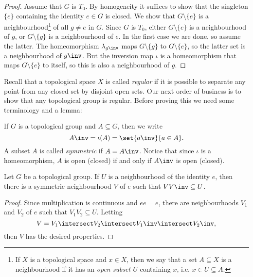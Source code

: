 \documentclass[article, a4paper, 11pt, oneside]{memoir}
\numberwithin{equation}{chapter}
\begin{document}
\begin{proof}
    Assume that $G$ is $T_0$. By homogeneity it suffices to show that the singleton $\{e\}$ containing the identity $e \in G$ is closed. We show that $G \setminus \{e\}$ is a neighbourhood\footnote{If $X$ is a topological space and $x \in X$, then we say that a set $A \subseteq X$ is a neighbourhood if it has an \emph{open subset $U$} containing $x$, i.e. $x \in U \subseteq A$.} of all $g \neq e$ in $G$. Since $G$ is $T_0$, either $G \setminus \{e\}$ is a neighbourhood of $g$, or $G \setminus \{g\}$ is a neighbourhood of $e$. In the first case we are done, so assume the latter. The homeomorphism $\leftmult_{g\inv}$ maps $G \setminus \{g\}$ to $G \setminus \{e\}$, so the latter set is a neighbourhood of $g\inv$. But the inversion map $\iota$ is a homeomorphism that maps $G \setminus \{e\}$ to itself, so this is also a neighbourhood of $g$.
\end{proof}

Recall that a topological space $X$ is called \emph{regular} if it is possible to separate any point from any closed set by disjoint open sets. Our next order of business is to show that any topological group is regular. Before proving this we need some terminology and a lemma:

If $G$ is a topological group and $A \subseteq G$, then we write
%
\begin{equation*}
    A\inv = \iota(A) = \set{a\inv}{a \in A}.
\end{equation*}
%
A subset $A$ is called \emph{symmetric} if $A = A\inv$. Notice that since $\iota$ is a homeomorphism, $A$ is open (closed) if and only if $A\inv$ is open (closed).

\begin{lemma}
    \label{thm:symmetric_nhood_of_e}
    Let $G$ be a topological group. If $U$ is a neighbourhood of the identity $e$, then there is a symmetric neighbourhood $V$ of $e$ such that $V V\inv \subseteq U$.
\end{lemma}

\begin{proof}
    Since multiplication is continuous and $ee = e$, there are neighbourhoods $V_1$ and $V_2$ of $e$ such that $V_1 V_2 \subseteq U$. Letting
    \begin{equation*}
        V = V_1 \intersect V_2 \intersect V_1\inv \intersect V_2\inv,
    \end{equation*}
    then $V$ has the desired properties.
\end{proof}
\end{document}
